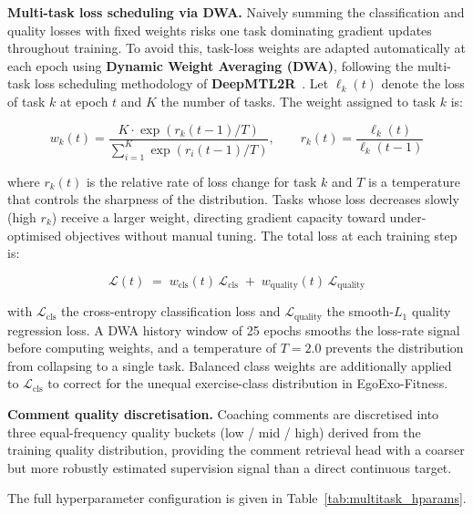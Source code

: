 \documentclass[conference,onecolumn,oneside]{IEEEtran}
\begin{document}
\textbf{Multi-task loss scheduling via DWA.}
Naively summing the classification and quality losses with fixed
weights risks one task dominating gradient updates throughout training.
To avoid this, task-loss weights are adapted automatically at each
epoch using \textbf{Dynamic Weight Averaging (DWA)}, following the
multi-task loss scheduling methodology of
\textbf{DeepMTL2R}~\cite{deepmtl2r}. Let $\ell_k(t)$ denote the loss
of task $k$ at epoch $t$ and $K$ the number of tasks. The weight
assigned to task $k$ is:

\begin{equation}
    w_k(t) = \frac{K \cdot \exp\!\left(r_k(t-1)/T\right)}
                  {\sum_{i=1}^{K}\exp\!\left(r_i(t-1)/T\right)},
    \qquad
    r_k(t) = \frac{\ell_k(t)}{\ell_k(t-1)}
\end{equation}

where $r_k(t)$ is the relative rate of loss change for task $k$ and
$T$ is a temperature that controls the sharpness of the distribution.
Tasks whose loss decreases slowly (high $r_k$) receive a larger
weight, directing gradient capacity toward under-optimised objectives
without manual tuning. The total loss at each training step is:

\begin{equation}
    \mathcal{L}(t) \;=\;
    w_{\mathrm{cls}}(t)\,\mathcal{L}_{\mathrm{cls}}
    \;+\;
    w_{\mathrm{quality}}(t)\,\mathcal{L}_{\mathrm{quality}}
\end{equation}

with $\mathcal{L}_{\mathrm{cls}}$ the cross-entropy classification
loss and $\mathcal{L}_{\mathrm{quality}}$ the smooth-$L_1$ quality
regression loss. A DWA history window of 25 epochs smooths the
loss-rate signal before computing weights, and a temperature of
$T{=}2.0$ prevents the distribution from collapsing to a single task.
Balanced class weights are additionally applied to
$\mathcal{L}_{\mathrm{cls}}$ to correct for the unequal
exercise-class distribution in EgoExo-Fitness.

\textbf{Comment quality discretisation.} Coaching comments are
discretised into three equal-frequency quality buckets (low / mid /
high) derived from the training quality distribution, providing the
comment retrieval head with a coarser but more robustly estimated
supervision signal than a direct continuous target.

The full hyperparameter configuration is given in
Table~\ref{tab:multitask_hparams}.
\end{document}
